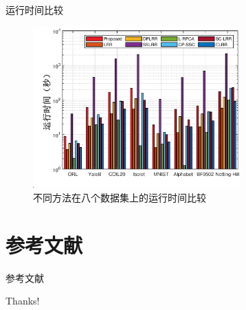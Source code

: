 \documentclass{beamer}
\begin{document}
\begin{frame}{运行时间比较}

\begin{figure}[htbp]
    \centering
    \includegraphics[width=8cm]{pic/7.eps}
    \caption{不同方法在八个数据集上的运行时间比较}
    \label{fig_time}
\end{figure}

\end{frame}

\section{参考文献}

\begin{frame}{参考文献}
    \small
    
      
\end{frame}

\begin{frame}
    \begin{center}
        {\Huge\calligra Thanks!}
    \end{center}
\end{frame}
\end{document}
